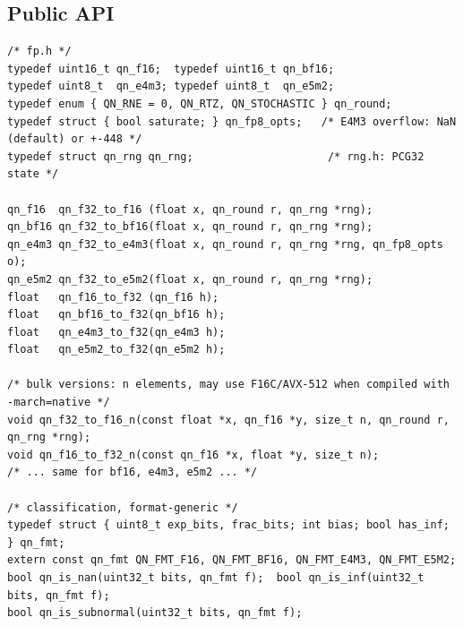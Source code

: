 \subsection{Public API}

\begin{lstlisting}[style=c]
/* fp.h */
typedef uint16_t qn_f16;  typedef uint16_t qn_bf16;
typedef uint8_t  qn_e4m3; typedef uint8_t  qn_e5m2;
typedef enum { QN_RNE = 0, QN_RTZ, QN_STOCHASTIC } qn_round;
typedef struct { bool saturate; } qn_fp8_opts;   /* E4M3 overflow: NaN (default) or +-448 */
typedef struct qn_rng qn_rng;                     /* rng.h: PCG32 state */

qn_f16  qn_f32_to_f16 (float x, qn_round r, qn_rng *rng);
qn_bf16 qn_f32_to_bf16(float x, qn_round r, qn_rng *rng);
qn_e4m3 qn_f32_to_e4m3(float x, qn_round r, qn_rng *rng, qn_fp8_opts o);
qn_e5m2 qn_f32_to_e5m2(float x, qn_round r, qn_rng *rng);
float   qn_f16_to_f32 (qn_f16 h);
float   qn_bf16_to_f32(qn_bf16 h);
float   qn_e4m3_to_f32(qn_e4m3 h);
float   qn_e5m2_to_f32(qn_e5m2 h);

/* bulk versions: n elements, may use F16C/AVX-512 when compiled with -march=native */
void qn_f32_to_f16_n(const float *x, qn_f16 *y, size_t n, qn_round r, qn_rng *rng);
void qn_f16_to_f32_n(const qn_f16 *x, float *y, size_t n);
/* ... same for bf16, e4m3, e5m2 ... */

/* classification, format-generic */
typedef struct { uint8_t exp_bits, frac_bits; int bias; bool has_inf; } qn_fmt;
extern const qn_fmt QN_FMT_F16, QN_FMT_BF16, QN_FMT_E4M3, QN_FMT_E5M2;
bool qn_is_nan(uint32_t bits, qn_fmt f);  bool qn_is_inf(uint32_t bits, qn_fmt f);
bool qn_is_subnormal(uint32_t bits, qn_fmt f);
\end{lstlisting}

